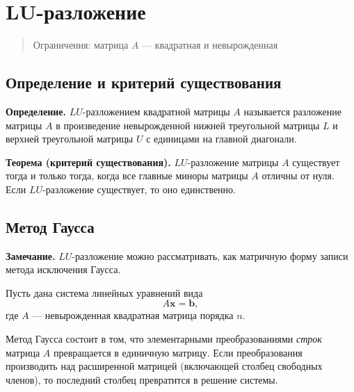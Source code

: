 \documentclass[11pt,a4paper]{article}
\begin{document}
    \hypertarget{mathbflu-ux440ux430ux437ux43bux43eux436ux435ux43dux438ux435}{%
\section{\texorpdfstring{\(\mathbf{LU}\)-разложение}{\textbackslash{}mathbf\{LU\}-разложение}}\label{mathbflu-ux440ux430ux437ux43bux43eux436ux435ux43dux438ux435}}

\begin{quote}
Ограничения: матрица \(A\) --- квадратная и невырожденная
\end{quote}

    \hypertarget{ux43eux43fux440ux435ux434ux435ux43bux435ux43dux438ux435-ux438-ux43aux440ux438ux442ux435ux440ux438ux439-ux441ux443ux449ux435ux441ux442ux432ux43eux432ux430ux43dux438ux44f}{%
\subsection{Определение и критерий
существования}\label{ux43eux43fux440ux435ux434ux435ux43bux435ux43dux438ux435-ux438-ux43aux440ux438ux442ux435ux440ux438ux439-ux441ux443ux449ux435ux441ux442ux432ux43eux432ux430ux43dux438ux44f}}

\textbf{Определение.} \(LU\)-разложением квадратной матрицы \(A\)
называется разложение матрицы \(A\) в произведение невырожденной нижней
треугольной матрицы \(L\) и верхней треугольной матрицы \(U\) с
единицами на главной диагонали.

\textbf{Теорема (критерий существования).} \(LU\)-разложение матрицы
\(A\) существует тогда и только тогда, когда все главные миноры матрицы
\(A\) отличны от нуля. Если \(LU\)-разложение существует, то оно
единственно.

    \hypertarget{ux43cux435ux442ux43eux434-ux433ux430ux443ux441ux441ux430}{%
\subsection{Метод
Гаусса}\label{ux43cux435ux442ux43eux434-ux433ux430ux443ux441ux441ux430}}

\textbf{Замечание.} \(LU\)-разложение можно рассматривать, как матричную
форму записи метода исключения Гаусса.

Пусть дана система линейных уравнений вида
\[ A \mathbf{x} = \mathbf{b}, \] где \(A\) --- невырожденная квадратная
матрица порядка \(n\).

Метод Гаусса состоит в том, что элементарными преобразованиями
\emph{строк} матрица \(A\) превращается в единичную матрицу. Если
преобразования производить над расширенной матрицей (включающей столбец
свободных членов), то последний столбец превратится в решение системы.
\end{document}
